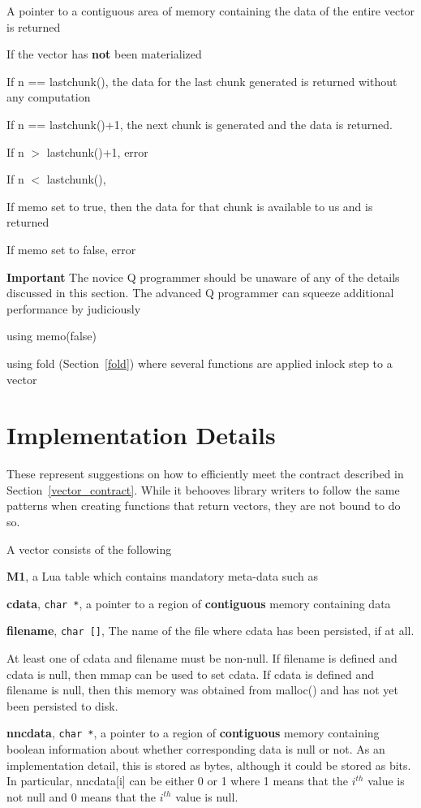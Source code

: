 A pointer to a contiguous area of memory containing the data of the
entire vector is returned
\ee
\item If the vector has {\bf not} been materialized
\be
\item If n == lastchunk(), the data for the last chunk generated is returned
without any computation
\item If n == lastchunk()+1, the next chunk is generated and the data is
returned.
\item If n \(>\) lastchunk()+1, error 
\item If n \(<\) lastchunk(), 

\be
\item If memo set to true, then the data for that chunk is available to us and
is returned
\item If memo set to false, error
\ee
\ee
\ee
\ee

{\bf Important}
The novice Q programmer should be unaware of any of the details discussed in
this section.
The advanced Q programmer can squeeze additional performance by judiciously 
\be
\item using memo(false)
\item using fold (Section~\ref{fold}) where several functions are applied inlock
step to a vector
\ee

\section{Implementation Details}
\label{vector_implementation}

These represent suggestions on how to efficiently meet the contract described in
Section~\ref{vector_contract}. While it behooves library writers to follow the
same patterns when creating functions that return vectors, they are not bound to
do so.

A vector consists of the following
\be
\item {\bf M1}, a Lua table which contains mandatory meta-data such as 
\be
\item {\bf cdata}, \verb+char *+, a pointer to a region of {\bf contiguous} memory
containing data 
\item {\bf filename}, \verb+char []+, The name of the file where cdata has been
persisted, if at all. 

At least one of cdata and filename must be non-null.
If filename is defined and cdata is null, then mmap can be used to set cdata. If
cdata is defined and filename is null, then this memory was obtained from
malloc()
and has not yet been persisted to disk.
\item {\bf nncdata}, \verb+char *+, a pointer to a region of {\bf contiguous} memory
containing boolean information about whether corresponding data is null or not.
As an implementation detail, this is stored as bytes, although it could be
stored as bits. In particular, nncdata[i] can be either 0 or 1 where 
1 means that the \(i^{th}\) value is not null and 
0 means that the \(i^{th}\) value is null. 

